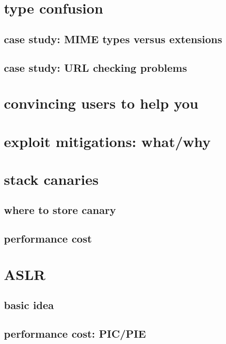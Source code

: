 \begin{frame}
    \titlepage
\end{frame}

\section{type confusion}

\subsection{case study: MIME types versus extensions}

\subsection{case study: URL checking problems}

\section{convincing users to help you}

\section{exploit mitigations: what/why}

\section{stack canaries}

\subsection{where to store canary}

\subsection{performance cost}


\section{ASLR}

\subsection{basic idea}

\subsection{performance cost: PIC/PIE}

